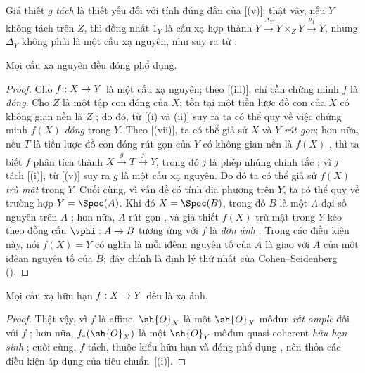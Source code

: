 \documentclass[oneside,10pt]{amsart}
\makeatletter
\newcommand{\ega@arrow}[2]{\mathchoice{#1}{#2}{#2}{#2}}
\renewcommand{\to}{\ega@arrow{\longrightarrow}{\rightarrow}}
\newcommand{\oldpage}[2][]{\marginnote{\normalfont\footnotesize\textbf{#1}~|~#2}\ignorespaces}
\let\EGAOriginalLabel\label
\renewcommand{\label}[1]{\phantomsection\EGAOriginalLabel{#1}}
\makeatother
\begin{document}
\begin{remark}[6.1.9]
\label{II.6.1.9}
Giả thiết $g$ \emph{tách} là thiết yếu đối với tính đúng đắn của [(v)]: thật vậy, nếu $Y$ không tách trên $Z$, thì đồng nhất $1_Y$ là cấu xạ hợp thành $Y\xrightarrow{\Delta_Y}Y\times_Z Y\xrightarrow{p_1}Y$, nhưng $\Delta_Y$ không phải là một cấu xạ nguyên, như suy ra từ :
\end{remark}

\begin{proposition}[6.1.10]
\label{II.6.1.10}
Mọi cấu xạ nguyên đều đóng phổ dụng.
\end{proposition}

\begin{proof}
Cho $f:X\to Y$ là một cấu xạ nguyên;
theo [(iii)], chỉ cần chứng minh $f$ là \emph{đóng}.
Cho $Z$ là một tập con đóng của $X$;
\oldpage[II]{113}
tồn tại một tiền lược đồ con của $X$ có không gian nền là $Z$ ; do đó, từ [(i) và (ii)] suy ra ta có thể quy về việc chứng minh $f(X)$ \emph{đóng} trong $Y$.
Theo [(vii)], ta có thể giả sử $X$ và $Y$ \emph{rút gọn};
hơn nữa, nếu $T$ là tiền lược đồ con đóng rút gọn của $Y$ có không gian nền là $\overline{f(X)}$ , thì ta biết $f$ phân tích thành $X\xrightarrow{g}T\xrightarrow{j}Y$, trong đó $j$ là phép nhúng chính tắc ; vì $j$ tách [(i)], từ [(v)] suy ra $g$ là một cấu xạ nguyên.
Do đó ta có thể giả sử $f(X)$ \emph{trù mật} trong $Y$.
Cuối cùng, vì vấn đề có tính địa phương trên $Y$, ta có thể quy về trường hợp $Y=\Spec(A)$.
Khi đó $X=\Spec(B)$, trong đó $B$ là một $A$-đại số nguyên trên $A$ ;
hơn nữa, $A$ rút gọn , và giả thiết $f(X)$ trù mật trong $Y$ kéo theo đồng cấu $\vphi:A\to B$ tương ứng với $f$ là \emph{đơn ánh} .
Trong các điều kiện này, nói $f(X)=Y$ có nghĩa là mỗi iđêan nguyên tố của $A$ là giao với $A$ của một iđêan nguyên tố của $B$; đây chính là định lý thứ nhất của Cohen--Seidenberg (\cite[t.~I, p.~257, th.~3]{I-13}).
\end{proof}

\begin{corollary}[6.1.11]
\label{II.6.1.11}
Mọi cấu xạ hữu hạn $f:X\to Y$ đều là xạ ảnh.
\end{corollary}

\begin{proof}
Thật vậy, vì $f$ là affine, $\sh{O}_X$ là một $\sh{O}_X$-môđun \emph{rất ample} đối với $f$ ;
hơn nữa, $f_*(\sh{O}_X)$ là một $\sh{O}_Y$-môđun quasi-coherent \emph{hữu hạn sinh} ;
cuối cùng, $f$ tách, thuộc kiểu hữu hạn và đóng phổ dụng , nên thỏa các điều kiện áp dụng của tiêu chuẩn~[(i)].
\end{proof}
\end{document}
